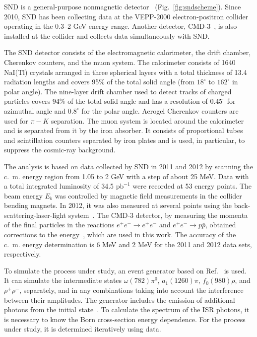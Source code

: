 \documentclass[twocolumn,aps,prd,floatfix,nofootinbib,superscriptaddress]{revtex4-2}
\begin{document}
SND is a general-purpose nonmagnetic detector~\cite{sndover1,sndover2,sndover3,sndover4} (Fig.~\ref{fig:sndscheme}).
Since 2010, SND has been collecting data at the VEPP-2000 electron-positron collider operating in the 0.3--2 GeV energy range.
Another detector, CMD-3~\cite{cmdover}, is also installed at the collider and collects data simultaneously with SND.

The SND detector consists of the electromagnetic calorimeter, the drift chamber, Cherenkov counters, and the muon system.
The calorimeter consists of 1640 NaI(Tl) crystals arranged in three spherical layers with a total thickness of 13.4 radiation lengths and covers 95\% of the total solid angle (from $18^\circ$ to $162^\circ$ in polar angle).
The nine-layer drift chamber used to detect tracks of charged particles covers 94\% of the total solid angle and has a resolution of $0.45^\circ$ for azimuthal angle and $0.8^\circ$ for the polar angle.
Aerogel Cherenkov counters are used for $\pi-K$ separation.
The muon system is located around the calorimeter and is separated from it by the iron absorber.
It consists of proportional tubes and scintillation counters separated by iron plates and is used, in particular, to suppress the cosmic-ray background.

The analysis is based on data collected by SND in 2011 and 2012 by scanning the c.~m. energy region from 1.05 to 2 GeV with a step of about 25 MeV.
Data with a total integrated luminosity of 34.5 $\text{pb}^{-1}$ were recorded at 53 energy points.
The beam energy $E_b$ was controlled by magnetic field measurements in the collider bending magnets.
In 2012, it was also measured at several points using the back-scattering-laser-light system~\cite{sndcompt,sndcompt2}.
The CMD-3 detector, by measuring the momenta of the final particles in the reactions \( e^+e^- \to e^+e^- \) and \( e^+e^- \to p\bar{p} \), obtained corrections to the energy~\cite{cmdenergy}, which are used in this work.
The accuracy of the c.~m. energy determination is 6 MeV and 2 MeV for the 2011 and 2012 data sets, respectively.

To simulate the process under study, an event generator based on Ref.~\cite{czyz} is used.
It can simulate the intermediate states $\omega(782)\pi^0$, $a_1 (1260)\pi$, $f_0(980)\rho$, and $\rho^+\rho^-$, separately, and in any combinations taking into account the interference between their amplitudes.
The generator includes the emission of additional photons from the initial state~\cite{kuraev,bonneau}.
To calculate the spectrum of the ISR photons, it is necessary to know the Born cross-section energy dependence. For the process under study, it is determined iteratively using data.
\end{document}
